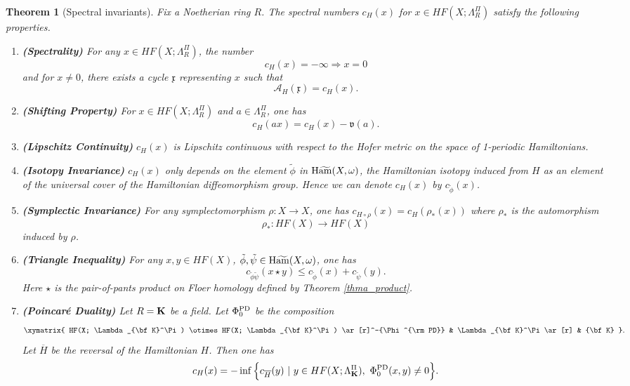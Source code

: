 \documentclass[reqno, 10pt]{amsart}
\numberwithin{equation}{section}
\numberwithin{equation}{section}
\newtheorem{thma}{Theorem}
\theoremstyle{definition}
\theoremstyle{remark}
\newcommand{\beqn}{\begin{equation*}}
\newcommand{\eeqn}{\end{equation*}}
\newcommand{\ov}{\overline}
\newcommand{\mc}{\mathcal}
\newcommand{\mf}{\mathfrak}
\newcommand{\wt}{\widetilde}
\newcommand{\wham}{{\rm H}\wt{\rm am}}
\begin{document}
\begin{thma}[Spectral invariants]\label{thma_spectral_invariants}
Fix a Noetherian ring $R$. The spectral numbers $c_H (x)$ for $x \in HF(X; \Lambda_R^\Pi)$ satisfy the following properties.
\begin{enumerate}

\item {\bf (Spectrality)} For any $x \in HF(X; \Lambda_R^\Pi)$, the number
\beqn
c_H(x) = -\infty \Longrightarrow x = 0
\eeqn
and for $x \neq 0$, there exists a cycle ${\mf x}$ representing $x$ such that 
\beqn
{\mc A}_H({\mf x}) = c_H(x).
\eeqn

\item {\bf (Shifting Property)} For $x \in HF (X; \Lambda_R^\Pi)$ and $a \in \Lambda_R^\Pi$, one has 
\beqn
c_H(a x) = c_H(x) - {\mf v}(a).
\eeqn

\item {\bf (Lipschitz Continuity)} $c_H(x)$ is Lipschitz continuous with respect to the Hofer metric on the space of 1-periodic Hamiltonians.

\item {\bf (Isotopy Invariance)} $c_H(x)$ only depends on the element $\tilde \phi$ in $\wham (X, \omega)$, the Hamiltonian isotopy induced from $H$ as an element of the universal cover of the Hamiltonian diffeomorphism group. Hence we can denote $c_H(x)$ by $c_{\tilde\phi}(x)$.

\item {\bf (Symplectic Invariance)} For any symplectomorphism $\rho: X \to X$, one has $c_{H\circ \rho}(x)  = c_H(\rho_*(x))$ where $\rho_*$ is the automorphism
\beqn
\rho_*: HF(X) \to HF(X)
\eeqn
induced by $\rho$.


\item {\bf (Triangle Inequality)} For any $x,y \in HF(X)$, $\tilde\phi, \tilde \psi \in \wham (X, \omega)$, one has 
\beqn
c_{\tilde\phi\tilde\psi}(x \star y )  \leq c_{\tilde\phi}(x) + c_{\tilde\psi}(y).
\eeqn
Here $\star$ is the pair-of-pants product on Floer homology defined by Theorem \ref{thma_product}.

\item {\bf (Poincar\'e Duality)} Let $R = {\bf K}$ be a field. Let $\Phi_0^{\rm PD}$ be the composition
\beqn
\xymatrix{ HF(X; \Lambda_{\bf K}^\Pi) \otimes HF(X; \Lambda_{\bf K}^\Pi) \ar[r]^-{\Phi^{\rm PD}}    &  \Lambda_{\bf K}^\Pi \ar[r]  &   {\bf K} }.
\eeqn
Let $\ov{H}$ be the reversal of the Hamiltonian $H$. Then one has
\beqn
c_H(x) = - \inf \Big\{ c_{\ov{H} }( y  )\ |\ y \in HF (X; \Lambda_{\bf K}^\Pi),\  \Phi_0^{\rm PD} ( x, y) \neq 0 \Big\}.
\eeqn

\end{enumerate}
\end{thma}
 
\end{document}
